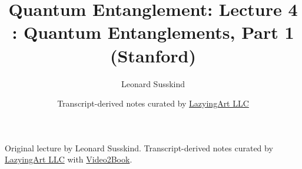 \documentclass[11pt,oneside]{book}
\begin{document}
\frontmatter
\title{Quantum Entanglement: Lecture 4 : Quantum Entanglements, Part 1 (Stanford)}
\author{Leonard Susskind}
\date{Transcript-derived notes curated by \href{https://lazying.art}{LazyingArt LLC}}
\maketitle
\begin{center}
\small Original lecture by Leonard Susskind. Transcript-derived notes curated by \href{https://lazying.art}{LazyingArt LLC} with \href{https://github.com/lachlanchen/Video2Book}{Video2Book}.
\end{center}
\clearpage
\mainmatter

\end{document}
